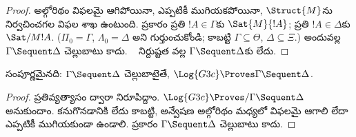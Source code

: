 \documentclass[../../../include/open-logic-section]{subfiles}
\begin{document}
\begin{proof}
  అల్గోరిథం విఫలమై ఆగిపోయినా, ఎప్పటికీ ముగియకపోయినా, $\Struct{M}$ను నిర్వచించగల విఫల శాఖ ఉంటుంది.  ప్రకారం ప్రతి $!A \in \Gamma$కు $\Sat{M}{!A}$; ప్రతి $!A \in \Delta$కు $\Sat/{M}{!A}$. ($\Pi_0 = \Gamma$, $\Lambda_0 =
  \Delta$ అని గుర్తుంచుకోండి; కాబట్టి $\Gamma \subseteq \Theta$, $\Delta \subseteq \Xi$.) అందువల్ల $\Gamma \Sequent \Delta$ చెల్లుబాటు కాదు. ~ నిర్దుష్టత వల్ల $\Gamma \Sequent \Delta$కు  లేదు.
\end{proof}

\begin{cor}
 సంపూర్ణమైనది: $\Gamma \Sequent \Delta$ చెల్లుబాటైతే, $\Log{G3c} \Proves \Gamma \Sequent \Delta$.
\end{cor}

\begin{proof}
  ప్రతివ్యత్యాసం ద్వారా నిరూపిద్దాం. $\Log{G3c} \Proves/ \Gamma
  \Sequent \Delta$ అనుకుందాం. కనుగొనడానికి  లేదు కాబట్టి, అన్వేషణ అల్గోరిథం మధ్యలో విఫలమై ఆగాలి లేదా ఎప్పటికీ ముగియకుండా ఉండాలి.  ప్రకారం $\Gamma \Sequent \Delta$ చెల్లుబాటు కాదు.
\end{proof}
\end{document}
